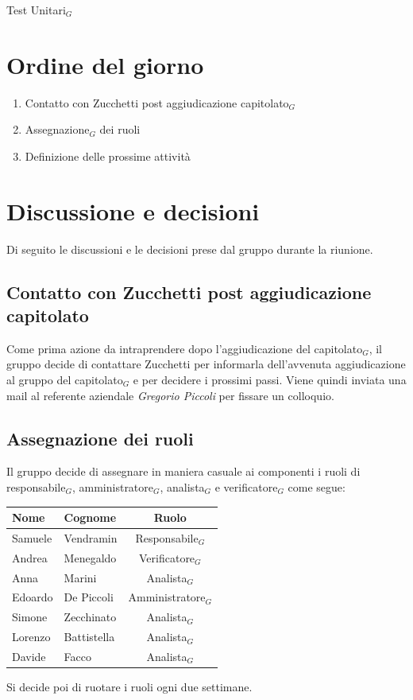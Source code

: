 \documentclass[a4paper, 10pt, colorlinks=true, linkcolor=black, urlcolor=blue, citecolor=blue, hidelinks]{article}
\begin{document}
Test Unitari$_G$

\section{Ordine del giorno}
\begin{enumerate}
    \item Contatto con Zucchetti post aggiudicazione capitolato$_G$
    \item Assegnazione$_G$ dei ruoli
    \item Definizione delle prossime attività
\end{enumerate}

\section{Discussione e decisioni}
Di seguito le discussioni e le decisioni prese dal gruppo durante la riunione.
\subsection{Contatto con Zucchetti post aggiudicazione capitolato}
Come prima azione da intraprendere dopo l'aggiudicazione del capitolato$_G$, il gruppo decide di contattare Zucchetti per informarla dell'avvenuta aggiudicazione al gruppo del capitolato$_G$ e per decidere i prossimi passi.
Viene quindi inviata una mail al referente aziendale \textit{Gregorio Piccoli} per fissare un colloquio.

\subsection{Assegnazione dei ruoli}
Il gruppo decide di assegnare in maniera casuale ai componenti i ruoli di responsabile$_G$, amministratore$_G$, analista$_G$ e verificatore$_G$ come segue:
\begin{center}
    \begin{tabular}{|l|l|c|}
        \hline
        \textbf{Nome} & \textbf{Cognome} & \textbf{Ruolo} \\
        \hline
        Samuele & Vendramin & Responsabile$_G$ \\
        \hline
        Andrea & Menegaldo & Verificatore$_G$ \\
        \hline
        Anna & Marini & Analista$_G$ \\ 
        \hline
        Edoardo & De Piccoli & Amministratore$_G$ \\
        \hline
        Simone & Zecchinato & Analista$_G$ \\
        \hline
        Lorenzo & Battistella & Analista$_G$ \\
        \hline
        Davide & Facco & Analista$_G$ \\       
        \hline  
    \end{tabular}
\end{center}
Si decide poi di ruotare i ruoli ogni due settimane.
\end{document}
